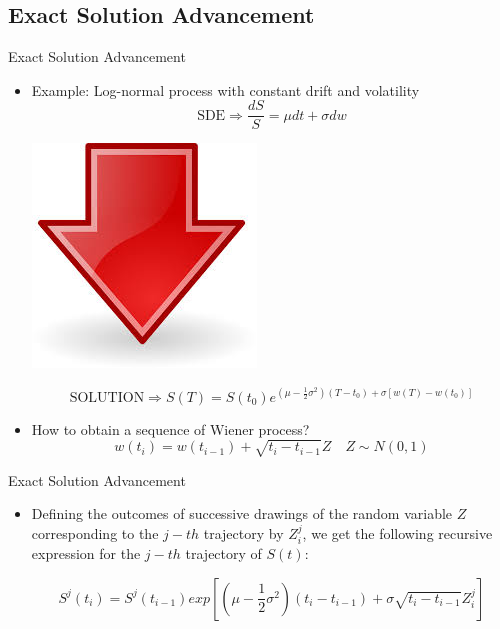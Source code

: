 \documentclass[11pt]{beamer}
\newcommand*{\itemimg}[1]{%
  \raisebox{-.3\baselineskip}{%
    \texttt{[image: \#1]}%
  }%
}
\begin{document}
\subsection{Exact Solution Advancement}
\begin{frame}{Exact Solution Advancement}
\begin{itemize}
\item Example: Log-normal process with constant drift and volatility
$$\text{SDE} \Rightarrow \frac{dS}{S} = \mu dt + \sigma dw$$
\begin{center}
\includegraphics[scale=.1]{img/down_arrow.jpg} 
\end{center}
$$\text{SOLUTION} \Rightarrow S(T)=S(t_0) e^{(\mu-\frac{1}{2} \sigma^2) (T-t_0) + \sigma[w(T) - w(t_0)]}$$

\item [\itemimg{./img/key_point.jpg}]  How to obtain a sequence of Wiener process?
$$
w(t_i) = w(t_{i-1}) + \sqrt{t_i - t_{i-1}} Z \quad Z \sim N(0,1)
$$
\end{itemize}
\end{frame}
\begin{frame}{Exact Solution Advancement}
\begin{itemize}
\item
Defining the outcomes of successive drawings of the random variable $Z$ corresponding to the $j-th$ trajectory by $Z^j_i$, we get the following recursive expression for the $j-th$ trajectory of $S(t)$:

$$
S^j(t_i) = S^j(t_{i-1}) exp \left[ \left( \mu - \frac{1}{2} \sigma^2 \right)
(t_i - t_{i-1}) + \sigma \sqrt{t_i - t_{i-1}} Z^j_i \right]
$$
\end{itemize}
\end{frame}
\end{document}
